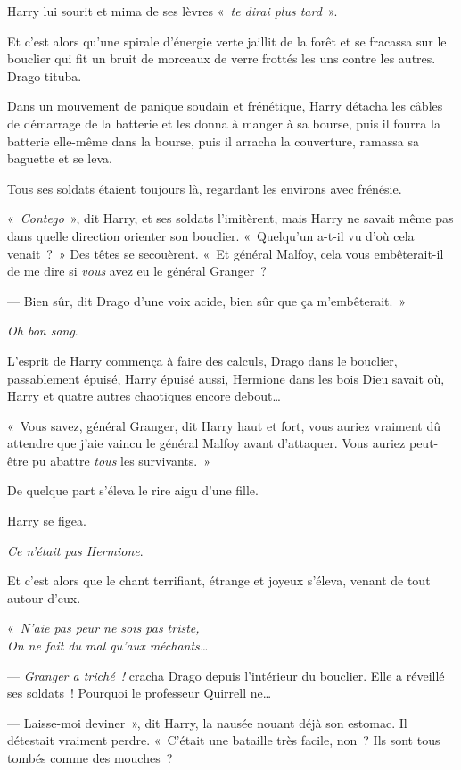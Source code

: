 {Harry lui sourit et mima de ses lèvres «~\emph{te dirai plus tard}~».

Et c'est alors qu'une spirale d'énergie verte jaillit de la forêt et se fracassa sur le bouclier qui fit un bruit de morceaux de verre frottés les uns contre les autres.
Drago tituba.

Dans un mouvement de panique soudain et frénétique, Harry détacha les câbles de démarrage de la batterie et les donna à manger à sa bourse, puis il fourra la batterie elle-même dans la bourse, puis il arracha la couverture, ramassa sa baguette et se leva.

Tous ses soldats étaient toujours là, regardant les environs avec frénésie.

«~\emph{Contego}~», dit Harry, et ses soldats l'imitèrent, mais Harry ne savait même pas dans quelle direction orienter son bouclier.
«~Quelqu'un a-t-il vu d'où cela venait~?~»
Des têtes se secouèrent.
«~Et général Malfoy, cela vous embêterait-il de me dire si \emph{vous} avez eu le général Granger~?

--- Bien sûr, dit Drago d'une voix acide, bien sûr que ça m'embêterait.~»

\emph{Oh bon sang}.

L'esprit de Harry commença à faire des calculs, Drago dans le bouclier, passablement épuisé, Harry épuisé aussi, Hermione dans les bois Dieu savait où, Harry et quatre autres chaotiques encore debout…

«~Vous savez, général Granger, dit Harry haut et fort, vous auriez vraiment dû attendre que j'aie vaincu le général Malfoy avant d'attaquer.
Vous auriez peut-être pu abattre \emph{tous} les survivants.~»

De quelque part s'éleva le rire aigu d'une fille.

Harry se figea.

\emph{Ce n'était pas Hermione}.

Et c'est alors que le chant terrifiant, étrange et joyeux s'éleva, venant de tout autour d'eux.

«~\emph{N'aie pas peur ne sois pas triste,\\ On ne fait du mal qu'aux méchants…}

--- \emph{Granger a triché~!} cracha Drago depuis l'intérieur du bouclier.
Elle a réveillé ses soldats~!
Pourquoi le professeur Quirrell ne…

--- Laisse-moi deviner~», dit Harry, la nausée nouant déjà son estomac.
Il détestait vraiment perdre.
«~C'était une bataille très facile, non~?
Ils sont tous tombés comme des mouches~?

}
